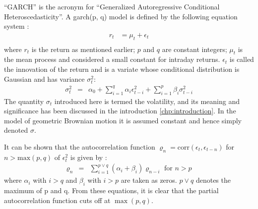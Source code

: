 \begin{enumerate}
``GARCH'' is the acronym for ``Generalized Autoregressive Conditional
Heteroscedasticity''. A \gls{garch}(p, q) model is defined by the following
equation system \cite{Bollerslev86}:
\begin{equation}
  \label{eq:garch_def}
  \begin{aligned}
    r_t &= \mu_t + \epsilon_t \\
  \end{aligned}
\end{equation}
where $r_t$ is the return as mentioned earlier; $p$ and $q$ are
constant integers; $\mu_t$ is the mean process and considered a small
constant for intraday returns. $\epsilon_t$ is called the innovation
of the return and is a variate whose conditional distribution
\footnotemark is Gaussian and has variance $\sigma^2_t$:
\begin{eqnarray*}
  \sigma_t^2 &=& \alpha_0 + \sum_{i=1}^q \alpha_i \epsilon_{t-i}^2 +
  \sum_{i=1}^p \beta_i \sigma_{t-i}^2
\end{eqnarray*}
The quantity $\sigma_t$ introduced here is termed the volatility, and
its meaning and significance has been discussed in the introduction
\ref{chp:introduction}. In the model of geometric Brownian motion it
is assumed constant and hence simply denoted $\sigma$.


It can be shown that the autocorrelation function $\varrho_n =
\text{corr}(\epsilon_t, \epsilon_{t-n})$ for $n > \text{max}(p,q)$ of
$\epsilon_t^2$ is given by \cite{Bollerslev87}:
\begin{eqnarray*}
\varrho_n &=& \sum_{i=1} ^{p \vee q}
(\alpha_i + \beta_i) \varrho_{n-i} \text{ for $n > p$}
\end{eqnarray*}
where $\alpha_i$ with $i > q$ and $\beta_i$ with $i > p$ are taken as
zeros. $p \vee q$ denotes the maximum of p and q. From these
equations, it is clear that the partial autocorrelation function cuts
off at $\max(p, q)$.


\end{enumerate}
